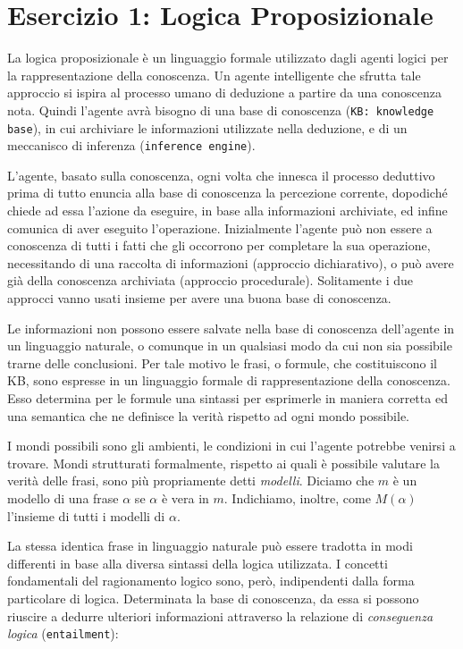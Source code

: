 \raggedright
{}
	\label{ch:cc}
	\section{Esercizio 1: Logica Proposizionale}
		\label{sec:es1}
		La logica proposizionale è un linguaggio formale utilizzato dagli agenti logici per la rappresentazione della conoscenza. Un agente intelligente che sfrutta tale approccio si ispira al processo umano di deduzione a partire da una conoscenza nota. Quindi l'agente avrà bisogno di una base di conoscenza (\texttt{KB: knowledge base}), in cui archiviare le informazioni utilizzate nella deduzione, e di un meccanisco di inferenza (\texttt{inference engine}).
		\par
		L'agente, basato sulla conoscenza, ogni volta che innesca il processo deduttivo prima di tutto enuncia alla base di conoscenza la percezione corrente, dopodiché chiede ad essa l'azione da eseguire, in base alla informazioni archiviate, ed infine comunica  di aver eseguito l'operazione. Inizialmente l'agente può non essere a conoscenza di tutti i fatti che gli occorrono per completare la sua operazione, necessitando di una raccolta di informazioni (approccio dichiarativo), o può avere già della conoscenza archiviata (approccio procedurale). Solitamente i due approcci vanno usati insieme per avere una buona base di conoscenza.
		\par
		Le informazioni non possono essere salvate nella base di conoscenza dell'agente in un linguaggio naturale, o comunque in un qualsiasi modo da cui non sia possibile trarne delle conclusioni. Per tale motivo le frasi, o formule, che costituiscono il KB, sono espresse in un linguaggio formale di rappresentazione della conoscenza. Esso determina per le formule una sintassi per esprimerle in maniera corretta ed una semantica che ne definisce la verità rispetto ad ogni mondo possibile.\par
		I mondi possibili sono gli ambienti, le condizioni in cui l'agente potrebbe venirsi a trovare. Mondi strutturati formalmente, rispetto ai quali è possibile valutare la verità delle frasi, sono più propriamente detti \emph{modelli}. Diciamo che $m$ è un modello di una frase $\alpha$ se $\alpha$ è vera in $m$. Indichiamo, inoltre, come $M(\alpha)$ l'insieme di tutti i modelli di $\alpha$.\par
		La stessa identica frase in linguaggio naturale può essere tradotta in modi differenti in base alla diversa sintassi della logica utilizzata. I concetti fondamentali del ragionamento logico sono, però, indipendenti dalla forma particolare di logica. Determinata la base di conoscenza, da essa si possono riuscire a dedurre ulteriori informazioni attraverso la relazione di \emph{conseguenza logica} (\texttt{entailment}):
